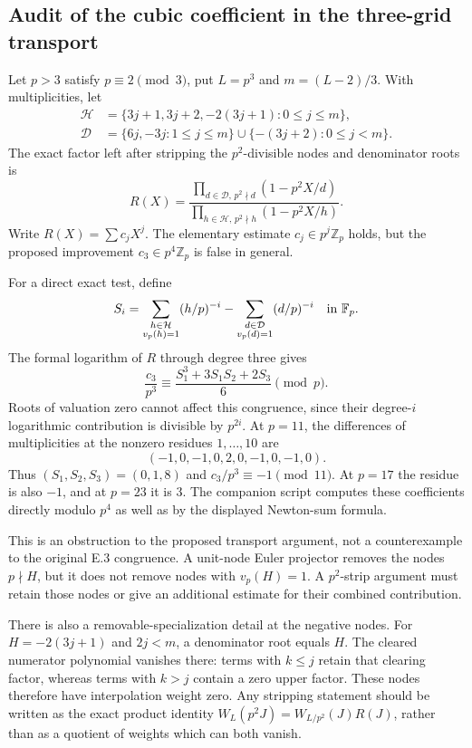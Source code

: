 \documentclass[11pt,letterpaper]{article}
\numberwithin{equation}{section}
\begin{document}
\subsection*{Audit of the cubic coefficient in the three-grid transport}

Let $p>3$ satisfy $p\equiv2\pmod3$, put $L=p^3$ and
$m=(L-2)/3$.  With multiplicities, let
\begin{align*}
 \mathcal H&=\{3j+1,3j+2,-2(3j+1):0\le j\le m\},\\
 \mathcal D&=\{6j,-3j:1\le j\le m\}
       \cup\{-(3j+2):0\le j<m\}.
\end{align*}
The exact factor left after stripping the $p^2$-divisible nodes and
denominator roots is
\[
 R(X)=\frac{\prod_{d\in\mathcal D,\,p^2\nmid d}(1-p^2X/d)}
 {\prod_{h\in\mathcal H,\,p^2\nmid h}(1-p^2X/h)}.
\]
Write $R(X)=\sum c_jX^j$.  The elementary estimate
$c_j\in p^j\mathbb Z_p$ holds, but the proposed improvement
$c_3\in p^4\mathbb Z_p$ is false in general.

For a direct exact test, define
\[
 S_i=\sum_{\substack{h\in\mathcal H\\v_p(h)=1}}(h/p)^{-i}
 -\sum_{\substack{d\in\mathcal D\\v_p(d)=1}}(d/p)^{-i}
 \quad\hbox{in }\mathbb F_p.
\]
The formal logarithm of $R$ through degree three gives
\[
 \frac{c_3}{p^3}\equiv
 \frac{S_1^3+3S_1S_2+2S_3}{6}\pmod p.
\]
Roots of valuation zero cannot affect this congruence, since their
degree-$i$ logarithmic contribution is divisible by $p^{2i}$.
At $p=11$, the differences of multiplicities at the nonzero residues
$1,\ldots,10$ are
\[
 (-1,0,-1,0,2,0,-1,0,-1,0).
\]
Thus $(S_1,S_2,S_3)=(0,1,8)$ and $c_3/p^3\equiv-1\pmod{11}$.
At $p=17$ the residue is also $-1$, and at $p=23$ it is $3$.
The companion script computes these coefficients directly modulo $p^4$
as well as by the displayed Newton-sum formula.

This is an obstruction to the proposed transport argument, not a
counterexample to the original E.3 congruence.  A unit-node Euler
projector removes the nodes $p\nmid H$, but it does not remove nodes
with $v_p(H)=1$.  A $p^2$-strip argument must retain those nodes or give
an additional estimate for their combined contribution.

There is also a removable-specialization detail at the negative nodes.
For $H=-2(3j+1)$ and $2j<m$, a denominator root equals $H$.
The cleared numerator polynomial vanishes there: terms with $k\le j$
retain that clearing factor, whereas terms with $k>j$ contain a zero
upper factor.  These nodes therefore have interpolation weight zero.
Any stripping statement should be written as the exact product identity
$W_L(p^2J)=W_{L/p^2}(J)R(J)$, rather than as a quotient of weights
which can both vanish.
\end{document}
